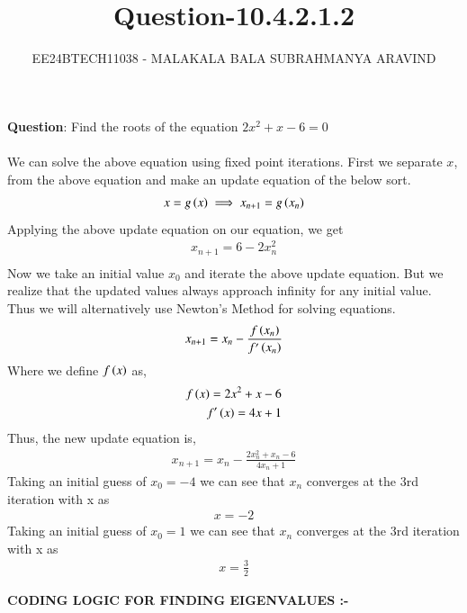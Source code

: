 \documentclass[journal]{IEEEtran}
\numberwithin{equation}{enumi}
\numberwithin{figure}{enumi}
\begin{document}

\title{Question-10.4.2.1.2}
\author{EE24BTECH11038 - MALAKALA BALA SUBRAHMANYA ARAVIND}
{\let\newpage\relax\maketitle}
\textbf{Question}:
Find the roots of the equation $2x^2+x-6=0$\\
\solution \\
We can solve the above equation using fixed point iterations. First we separate $x$, from the above equation and make an update equation of the below sort.
\begin{align}
	x = g\left(x\right) \implies x_{n+1} = g\left(x_n\right)
\end{align}
Applying the above update equation on our equation, we get
\begin{align}
    x_{n+1}=6-2x_n^2\\
\end{align}
Now we take an initial value $x_0$ and iterate the above update equation. But we realize that the updated values always approach infinity for any initial value. \\
Thus we will alternatively use Newton's Method for solving equations.
\begin{align}
	x_{n+1} = x_n - \frac{f\left(x_n\right)}{f^{\prime}\left(x_n\right)} 
\end{align}
Where we define $f\left(x\right)$ as, 
\begin{align}
	f\left(x\right) = 2x^2+x-6 \\
	f^{\prime}\left(x\right) = 4x+1
\end{align}
Thus, the new update equation is, 
\begin{align}
	x_{n+1} = x_n - \frac{2x_n^2+x_n-6}{4x_n+1 } 
\end{align}
Taking an initial guess of $x_0=-4$ we can see that $x_n$ converges at the 3rd iteration with x as
\begin{align}
    x=-2
\end{align}
Taking an initial guess of $x_0=1$ we can see that $x_n$ converges at the 3rd iteration with x as
\begin{align}
    x=\frac{3}{2}
\end{align}


\textbf{CODING LOGIC FOR FINDING EIGENVALUES :-}\\
\end{document}
